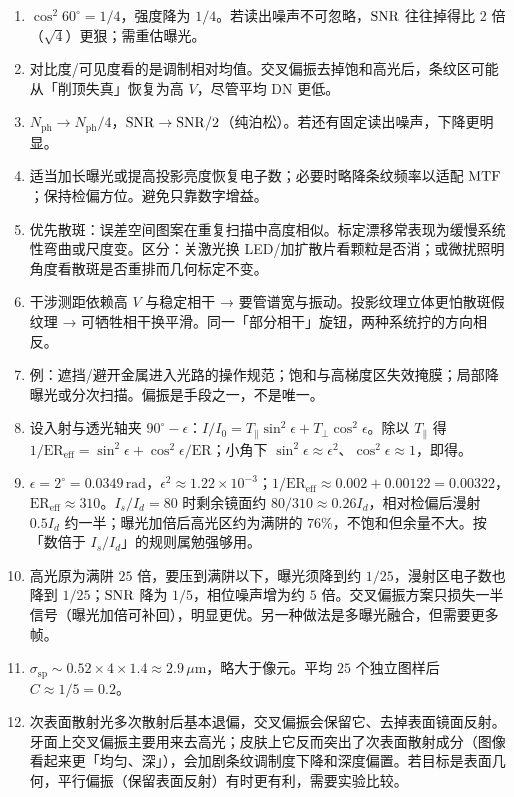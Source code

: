 \begin{enumerate}
  \item $\cos^{2}60^\circ=1/4$，强度降为 $1/4$。若读出噪声不可忽略，$\mathrm{SNR}$ 往往掉得比 $2$ 倍（$\sqrt{4}$）更狠；需重估曝光。
  \item 对比度/可见度看的是调制相对均值。交叉偏振去掉饱和高光后，条纹区可能从「削顶失真」恢复为高 $V$，尽管平均 DN 更低。
  \item $N_{\mathrm{ph}}\to N_{\mathrm{ph}}/4$，$\mathrm{SNR}\to\mathrm{SNR}/2$（纯泊松）。若还有固定读出噪声，下降更明显。
  \item 适当加长曝光或提高投影亮度恢复电子数；必要时略降条纹频率以适配 $\mathrm{MTF}$；保持检偏方位。避免只靠数字增益。
  \item 优先散斑：误差空间图案在重复扫描中高度相似。标定漂移常表现为缓慢系统性弯曲或尺度变。区分：关激光换 LED/加扩散片看颗粒是否消；或微扰照明角度看散斑是否重排而几何标定不变。
  \item 干涉测距依赖高 $V$ 与稳定相干 → 要管谱宽与振动。投影纹理立体更怕散斑假纹理 → 可牺牲相干换平滑。同一「部分相干」旋钮，两种系统拧的方向相反。
  \item 例：遮挡/避开金属进入光路的操作规范；饱和与高梯度区失效掩膜；局部降曝光或分次扫描。偏振是手段之一，不是唯一。
  \item 设入射与透光轴夹 $90^\circ-\epsilon$：$I/I_0=T_\parallel\sin^2\epsilon+T_\perp\cos^2\epsilon$。除以 $T_\parallel$ 得 $1/\mathrm{ER}_{\mathrm{eff}}=\sin^2\epsilon+\cos^2\epsilon/\mathrm{ER}$；小角下 $\sin^2\epsilon\approx\epsilon^2$、$\cos^2\epsilon\approx1$，即得。
  \item $\epsilon=2^\circ=0.0349\,\mathrm{rad}$，$\epsilon^2\approx1.22\times10^{-3}$；$1/\mathrm{ER}_{\mathrm{eff}}\approx0.002+0.00122=0.00322$，$\mathrm{ER}_{\mathrm{eff}}\approx310$。$I_s/I_d=80$ 时剩余镜面约 $80/310\approx0.26I_d$，相对检偏后漫射 $0.5I_d$ 约一半；曝光加倍后高光区约为满阱的 $76\%$，不饱和但余量不大。按「数倍于 $I_s/I_d$」的规则属勉强够用。
  \item 高光原为满阱 $25$ 倍，要压到满阱以下，曝光须降到约 $1/25$，漫射区电子数也降到 $1/25$；$\mathrm{SNR}$ 降为 $1/5$，相位噪声增为约 $5$ 倍。交叉偏振方案只损失一半信号（曝光加倍可补回），明显更优。另一种做法是多曝光融合，但需要更多帧。
  \item $\sigma_{\mathrm{sp}}\sim0.52\times4\times1.4\approx2.9\,\mu\mathrm{m}$，略大于像元。平均 $25$ 个独立图样后 $C\approx1/5=0.2$。
  \item 次表面散射光多次散射后基本退偏，交叉偏振会保留它、去掉表面镜面反射。牙面上交叉偏振主要用来去高光；皮肤上它反而突出了次表面散射成分（图像看起来更「均匀、深」），会加剧条纹调制度下降和深度偏置。若目标是表面几何，平行偏振（保留表面反射）有时更有利，需要实验比较。
\end{enumerate}

